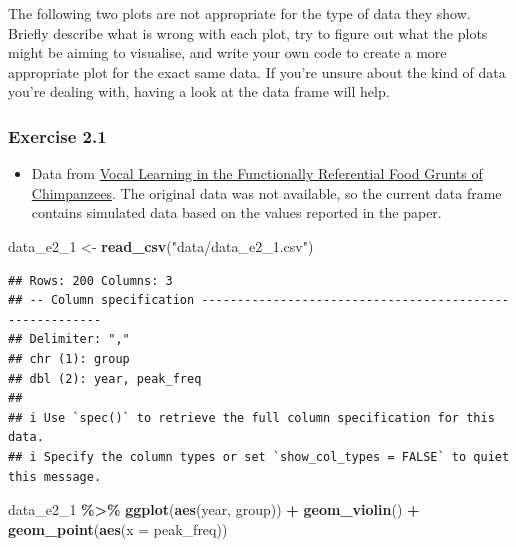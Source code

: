 \documentclass[
]{article}
\newenvironment{Shaded}{\begin{snugshade}}{\end{snugshade}}
\newcommand{\AttributeTok}[1]{\textcolor[rgb]{0.13,0.29,0.53}{#1}}
\newcommand{\FunctionTok}[1]{\textcolor[rgb]{0.13,0.29,0.53}{\textbf{#1}}}
\newcommand{\NormalTok}[1]{#1}
\newcommand{\OtherTok}[1]{\textcolor[rgb]{0.56,0.35,0.01}{#1}}
\newcommand{\SpecialCharTok}[1]{\textcolor[rgb]{0.81,0.36,0.00}{\textbf{#1}}}
\newcommand{\StringTok}[1]{\textcolor[rgb]{0.31,0.60,0.02}{#1}}
\providecommand{\tightlist}{%
  \setlength{\itemsep}{0pt}\setlength{\parskip}{0pt}}
\begin{document}
The following two plots are not appropriate for the type of data they
show. Briefly describe what is wrong with each plot, try to figure out
what the plots might be aiming to visualise, and write your own code to
create a more appropriate plot for the exact same data. If you're unsure
about the kind of data you're dealing with, having a look at the data
frame will help.

\subsubsection{Exercise 2.1}\label{exercise-2.1}

\begin{itemize}
\tightlist
\item
  Data from \href{https://doi.org/10.1016/j.cub.2014.12.032}{Vocal
  Learning in the Functionally Referential Food Grunts of Chimpanzees}.
  The original data was not available, so the current data frame
  contains simulated data based on the values reported in the paper.
\end{itemize}

\begin{Shaded}
\begin{Highlighting}[]
\NormalTok{data\_e2\_1 }\OtherTok{\textless{}{-}} \FunctionTok{read\_csv}\NormalTok{(}\StringTok{"data/data\_e2\_1.csv"}\NormalTok{)}
\end{Highlighting}
\end{Shaded}

\begin{verbatim}
## Rows: 200 Columns: 3
## -- Column specification --------------------------------------------------------
## Delimiter: ","
## chr (1): group
## dbl (2): year, peak_freq
## 
## i Use `spec()` to retrieve the full column specification for this data.
## i Specify the column types or set `show_col_types = FALSE` to quiet this message.
\end{verbatim}

\begin{Shaded}
\begin{Highlighting}[]
\NormalTok{data\_e2\_1 }\SpecialCharTok{\%\textgreater{}\%}
  \FunctionTok{ggplot}\NormalTok{(}\FunctionTok{aes}\NormalTok{(year, group)) }\SpecialCharTok{+}
  \FunctionTok{geom\_violin}\NormalTok{() }\SpecialCharTok{+}
  \FunctionTok{geom\_point}\NormalTok{(}\FunctionTok{aes}\NormalTok{(}\AttributeTok{x =}\NormalTok{ peak\_freq))}
\end{Highlighting}
\end{Shaded}
\end{document}
